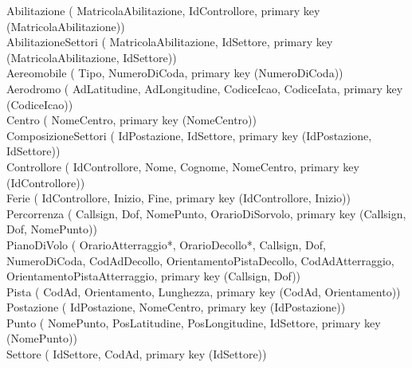 Abilitazione (
     MatricolaAbilitazione,
     IdControllore,
     primary key (MatricolaAbilitazione))\\

AbilitazioneSettori (
     MatricolaAbilitazione,
     IdSettore,
     primary key (MatricolaAbilitazione, IdSettore))\\

Aereomobile (
     Tipo,
     NumeroDiCoda,
     primary key (NumeroDiCoda))\\

Aerodromo (
     AdLatitudine,
     AdLongitudine,
     CodiceIcao,
     CodiceIata,
     primary key (CodiceIcao))\\

Centro (
     NomeCentro,
     primary key (NomeCentro))\\

ComposizioneSettori (
     IdPostazione,
     IdSettore,
     primary key (IdPostazione, IdSettore))\\

Controllore (
     IdControllore,
     Nome,
     Cognome,
     NomeCentro,
     primary key (IdControllore))\\

Ferie (
     IdControllore,
     Inizio,
     Fine,
     primary key (IdControllore, Inizio))\\

Percorrenza (
     Callsign,
     Dof,
     NomePunto,
     OrarioDiSorvolo,
     primary key (Callsign, Dof, NomePunto))\\

PianoDiVolo (
     OrarioAtterraggio*,
     OrarioDecollo*,
     Callsign,
     Dof,
     NumeroDiCoda,
     CodAdDecollo,
     OrientamentoPistaDecollo,
     CodAdAtterraggio,
     OrientamentoPistaAtterraggio,
     primary key (Callsign, Dof))\\

Pista (
     CodAd,
     Orientamento,
     Lunghezza,
     primary key (CodAd, Orientamento))\\

Postazione (
     IdPostazione,
     NomeCentro,
     primary key (IdPostazione))\\

Punto (
     NomePunto,
     PosLatitudine,
     PosLongitudine,
     IdSettore,
     primary key (NomePunto))\\

Settore (
     IdSettore,
     CodAd,
     primary key (IdSettore))\\

